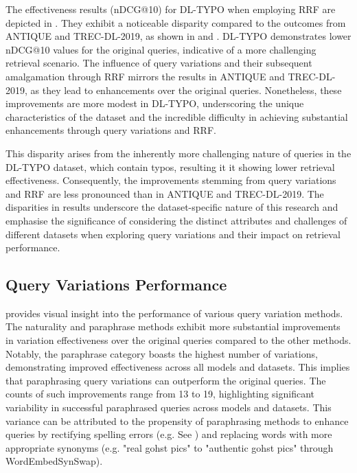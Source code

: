 The effectiveness results (nDCG@10) for DL-TYPO when employing RRF are depicted in . They exhibit a noticeable disparity compared to the outcomes from ANTIQUE and TREC-DL-2019, as shown in  and . DL-TYPO demonstrates lower nDCG@10 values for the original queries, indicative of a more challenging retrieval scenario. The influence of query variations and their subsequent amalgamation through RRF mirrors the results in ANTIQUE and TREC-DL-2019, as they lead to enhancements over the original queries. Nonetheless, these improvements are more modest in DL-TYPO, underscoring the unique characteristics of the dataset and the incredible difficulty in achieving substantial enhancements through query variations and RRF.

This disparity arises from the inherently more challenging nature of queries in the DL-TYPO dataset, which contain typos, resulting it it showing lower retrieval effectiveness. Consequently, the improvements stemming from query variations and RRF are less pronounced than in ANTIQUE and TREC-DL-2019. The disparities in results underscore the dataset-specific nature of this research and emphasise the significance of considering the distinct attributes and challenges of different datasets when exploring query variations and their impact on retrieval performance.

\subsection{Query Variations Performance}
 provides visual insight into the performance of various query variation methods. The naturality and paraphrase methods exhibit more substantial improvements in variation effectiveness over the original queries compared to the other methods. Notably, the paraphrase category boasts the highest number of variations, demonstrating improved effectiveness across all models and datasets. This implies that paraphrasing query variations can outperform the original queries. The counts of such improvements range from 13 to 19, highlighting significant variability in successful paraphrased queries across models and datasets. This variance can be attributed to the propensity of paraphrasing methods to enhance queries by rectifying spelling errors (e.g. See ) and replacing words with more appropriate synonyms (e.g. "real gohst pics" to "authentic gohst pics" through WordEmbedSynSwap).


